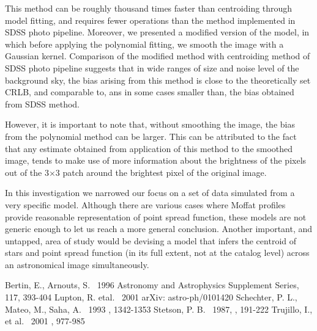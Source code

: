 \documentclass[12pt, preprint]{aastex}
\begin{document}
This method can be roughly thousand times faster than centroiding through model fitting, and requires fewer operations than the method implemented in SDSS photo pipeline. Moreover, we presented a modified version of the model, in which before applying the polynomial fitting, we smooth the image with a Gaussian kernel. Comparison of the modified method with centroiding method of SDSS photo pipeline suggests that in wide ranges of size and noise level of the background sky, the bias arising from this method is close to the theoretically set CRLB, and comparable to, ans in some cases smaller than, the bias obtained from SDSS method. 

However, it is important to note that, without smoothing the image, the bias from the polynomial method can be larger. This can be attributed to the fact that any estimate obtained from application of this method to the smoothed image, tends to make use of more information about the brightness of the pixels out of the 3$\times$3
patch around the brightest pixel of the original image. 

In this investigation we narrowed our focus on a set of data simulated from a very specific model. Although there are various cases where Moffat profiles provide reasonable representation of point spread function, these models are not generic enough to let us reach a more general conclusion. Another important, and untapped, area of study would be devising a model that infers the centroid of stars and point spread function (in its full extent, not at the catalog level) across an astronomical image simultaneously. 




\begin{thebibliography}{70}

 Bertin, E., Arnouts, S. \ 1996  Astronomy and Astrophysics Supplement Series, 117, 393-404
 Lupton, R. etal. \ 2001  arXiv: astro-ph/0101420
 Schechter, P. L., Mateo, M., Saha, A. \ 1993 \pasp, 1342-1353
 Stetson, P. B. \ 1987, \pasp, 191-222
 Trujillo, I., et al. \ 2001 \mnras, 977-985

\end{thebibliography}

\clearpage
\end{document}

